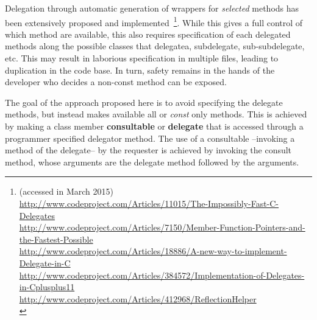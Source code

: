 \documentclass{article}
\begin{document}
Delegation through automatic generation of wrappers for \textit{selected} methods has been extensively proposed and implemented~\footnote{(accessed in March 2015)\\
\url{http://www.codeproject.com/Articles/11015/The-Impossibly-Fast-C-Delegates}\\
\url{http://www.codeproject.com/Articles/7150/Member-Function-Pointers-and-the-Fastest-Possible}\\
\url{http://www.codeproject.com/Articles/18886/A-new-way-to-implement-Delegate-in-C}\\
\url{http://www.codeproject.com/Articles/384572/Implementation-of-Delegates-in-Cplusplus11}\\
\url{http://www.codeproject.com/Articles/412968/ReflectionHelper}\\
}.  While this gives a full control of which method are available, this also requires specification of each delegated methods along the possible classes that delegatea, subdelegate, sub-subdelegate, etc. This may result in laborious specification in multiple files, leading to duplication in the code base. In turn, safety remains in the hands of the developer who decides a non-const method can be exposed. 

The goal of the approach proposed here is to avoid specifying the delegate methods, but instead makes available all or \textit{const} only methods. This is achieved by making a class member \textbf{consultable} or \textbf{delegate} that is accessed through a programmer specified delegator method. The use of a consultable --invoking a method of the delegate-- by the requester is achieved by invoking the consult method, whose arguments are the delegate method followed by the arguments. 
\end{document}
